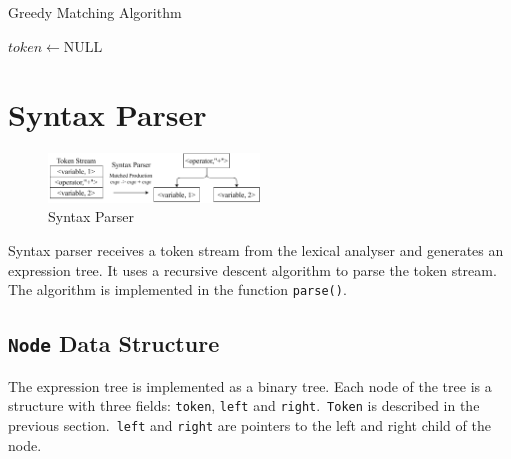 \documentclass[a4paper,oneside]{book}
\begin{document}
\begin{algorithm}[H]
    \caption{Greedy Matching Algorithm}\label{alg:1}
    \DontPrintSemicolon
    \BlankLine
    $token \gets \text{NULL}$\;
\end{algorithm}

\section{Syntax Parser}

\begin{figure}
    \caption{Syntax Parser}
    \centering
    \includegraphics[width=0.5\textwidth]{src/syntax.drawio.pdf}
\end{figure}

Syntax parser receives a token stream from the lexical analyser and generates an expression tree. It uses a recursive descent algorithm to parse the token stream. The algorithm is implemented in the function \verb|parse()|.

\subsection{\texttt{Node} Data Structure}

The expression tree is implemented as a binary tree. Each node of the tree is a structure with three fields: \verb|token|, \verb|left| and \verb|right|.\ \verb|Token| is described in the previous section.\ \verb|left| and \verb|right| are pointers to the left and right child of the node.
\end{document}
